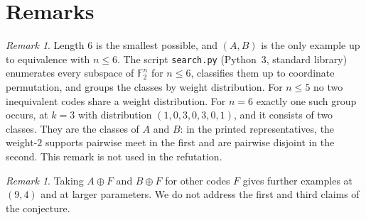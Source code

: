 \documentclass[11pt]{article}
\theoremstyle{plain}
\theoremstyle{definition}
\theoremstyle{remark}
\newtheorem{remark}[theorem]{Remark}
\newcommand{\F}{\mathbb F}
\begin{document}
\section{Remarks}

\begin{remark}
Length $6$ is the smallest possible, and $(A,B)$ is the only example up to
equivalence with $n\le6$. The script \texttt{search.py} (Python~3, standard library)
enumerates every subspace of $\F_2^n$ for $n\le6$, classifies them up to coordinate
permutation, and groups the classes by weight distribution. For $n\le5$ no two
inequivalent codes share a weight distribution. For $n=6$ exactly one such group
occurs, at $k=3$ with distribution $(1,0,3,0,3,0,1)$, and it consists of two classes.
They are the classes of $A$ and $B$: in the printed representatives, the weight-$2$
supports pairwise meet in the first and are pairwise disjoint in the second. This
remark is not used in the refutation.
\end{remark}

\begin{remark}
Taking $A\oplus F$ and $B\oplus F$ for other codes $F$ gives further examples at
$(9,4)$ and at larger parameters. We do not address the first and third claims of
the conjecture.
\end{remark}
\end{document}
